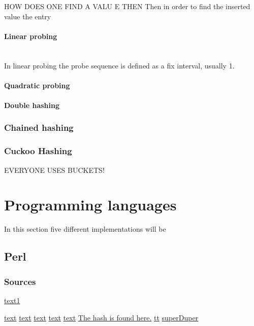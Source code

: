 \documentclass[titlepage]{article}
\newcommand{\myparagraph}[1]{\paragraph{#1}\mbox{}\\}
\begin{document}
	HOW DOES ONE FIND A VALU E THEN	Then in order to find the inserted value the entry 	
	\myparagraph{Linear probing}
	In linear probing the probe sequence is defined as a fix interval, usually 1. 
	
	\paragraph{Quadratic probing}
	
	\paragraph{Double hashing}
	
	
	\subsubsection{Chained hashing}
	
	
	\subsubsection{Cuckoo Hashing}
	
	
	
	
	

	EVERYONE USES BUCKETS!
	
	\section{Programming languages}
	
	In this section five different implementations will be 
	
	
	\subsection{Perl}
	\subsubsection{Sources}
	
	\href{http://www.perl.com/pub/2002/10/01/hashes.html}{text1}
	
\href{http://burtleburtle.net/bob/hash/}{text}
\href{http://burtleburtle.net/bob/hash/doobs.html}{text}
\href{http://www.perlmonks.org/bare/?node_id=750745}{text}
\href{	http://ods.com.ua/win/eng/program/Perl5Unleashed/ch25.phtml}{text}
\href{	http://cpansearch.perl.org/src/NWCLARK/perl-5.8.8/hv.c}{text}
\href{http://cpansearch.perl.org/src/NWCLARK/perl-5.8.8/hv.h}{The hash is found here.}
\href{http://perl.plover.com/FakeHash/FakeHash.pm}{tt}
\href{http://www.perl.com/pub/2002/10/01/hashes.html}{superDuper}
\end{document}
